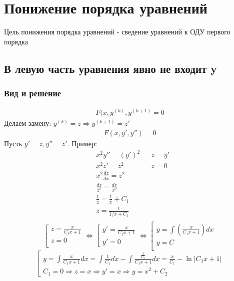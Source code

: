 \documentclass[fontsize=10pt,a4paper,fleqn]{scrreprt} %
\numberwithin{equation}{section}
\begin{document}
\chapter{Понижение порядка уравнений}
Цель понижения порядка уравнений \-- сведение уравнений к ОДУ первого порядка
\label{sec:manyderivatives}
\section{В левую часть уравнения явно не входит y}
\subsection{Вид и решение}
\begin{align}
  F(x, y^{(k)}, y^{(k+1)} = 0
\end{align}
Делаем замену: $y^{(k)} = z \Rightarrow y^{(k+1)} = z'$
\begin{align}
  F(x, y', y'') = 0
\end{align}
Пусть $y' = z, y'' = z'$. Пример:
\begin{align*}
&  x^2y'' = (y')^2  && z = y'\\
& x^2z' = z^2 && z = 0\\
&x^2\frac{dz}{dx} = z^2\\
&\frac{dz}{z^2} = \frac{dx}{x^2}\\
&\frac1z = \frac1x + C_1\\
&z =  \frac1{1/x + C_1}\\
\end{align*}
\begin{equation*}
  \left[
    \begin{array}{ll}
z = \frac{x}{C_1 x+1}\\
z =0 \\
\end{array}
\right. \Leftrightarrow
\left[
\begin{array}{ll}
  y' = \frac{x}{C_1x + 1}\\
  y' = 0
\end{array}
\right. \Leftrightarrow
\left[
  \begin{array}{ll}
    y = \int\left(\frac{x}{C_1x+1}\right)dx\\
    y = C\\
  \end{array}
\right.
\end{equation*}
\begin{equation*}
  \left[
  \begin{array}{ll}
    y = \int \frac{x}{C_1x + 1}dx = \int\frac1{C_1}dx - \int \frac{\frac1{C_1}}{C_1x + 1} dx = \frac{x}{C_1} -\ln |C_1x + 1|\\
    C_1 = 0 \Rightarrow z = x \Rightarrow y' = x \Rightarrow y = x^2+C_2
  \end{array}
  \right.
\end{equation*}
\end{document}
